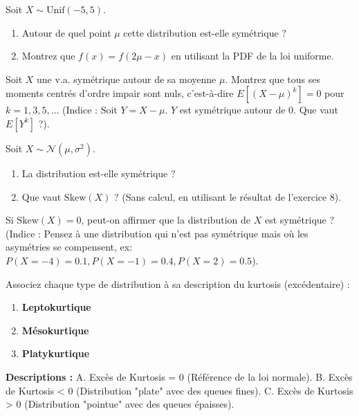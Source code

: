 \begin{exercicebox}
Soit $X \sim \text{Unif}(-5, 5)$.
\begin{enumerate}
    \item Autour de quel point $\mu$ cette distribution est-elle symétrique ?
    \item Montrez que $f(x) = f(2\mu - x)$ en utilisant la PDF de la loi uniforme.
\end{enumerate}
\end{exercicebox}

\begin{exercicebox}
Soit $X$ une v.a. symétrique autour de sa moyenne $\mu$.
Montrez que tous ses moments centrés d'ordre impair sont nuls, c'est-à-dire $E[(X-\mu)^k] = 0$ pour $k=1, 3, 5, \dots$
(Indice : Soit $Y = X-\mu$. $Y$ est symétrique autour de 0. Que vaut $E[Y^k]$ ?).
\end{exercicebox}

\begin{exercicebox}
Soit $X \sim \mathcal{N}(\mu, \sigma^2)$.
\begin{enumerate}
    \item La distribution est-elle symétrique ?
    \item Que vaut $\text{Skew}(X)$ ? (Sans calcul, en utilisant le résultat de l'exercice 8).
\end{enumerate}
\end{exercicebox}

\begin{exercicebox}
Si $\text{Skew}(X) = 0$, peut-on affirmer que la distribution de $X$ est symétrique ?
(Indice : Pensez à une distribution qui n'est pas symétrique mais où les asymétries se compensent, ex: $P(X=-4)=0.1, P(X=-1)=0.4, P(X=2)=0.5$).
\end{exercicebox}


\begin{exercicebox}
Associez chaque type de distribution à sa description du kurtosis (excédentaire) :
\begin{enumerate}
    \item \textbf{Leptokurtique}
    \item \textbf{Mésokurtique}
    \item \textbf{Platykurtique}
\end{enumerate}

\textbf{Descriptions :}
A. Excès de Kurtosis = 0 (Référence de la loi normale).
B. Excès de Kurtosis < 0 (Distribution "plate" avec des queues fines).
C. Excès de Kurtosis > 0 (Distribution "pointue" avec des queues épaisses).
\end{exercicebox}

